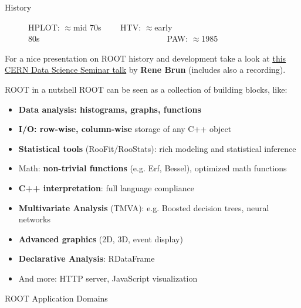\documentclass[aspectratio=169]{beamer}
\newcommand{\myfigure}[2]{
    \begin{figure}
        \makebox[\textwidth]{%
            \texttt{[image: \#2]}
        }
    \end{figure}
}
\newcommand{\myhref}[2]{{\color{blue}\href{#1}{\underline{#2}}}}
\begin{document}
\begin{frame}{History}
\begin{figure}
    HPLOT: $\approx$mid 70s ~~~~HTV: $\approx$early 80s~~~~~~~~~~~~~~~~~~~~~~~~~~~~~~~PAW: $\approx$1985
    \end{figure}
    \vspace{5mm}
    For a nice presentation on ROOT history and development take a look at \myhref{https://indico.cern.ch/event/667648/}{this CERN Data Science Seminar talk} by \textbf{Rene Brun} (includes also a recording).
\end{frame}

\begin{frame}{ROOT in a nutshell}
ROOT can be seen as a collection of building blocks, like:
\begin{itemize}
    \item \textbf{Data analysis: histograms, graphs, functions}
    \item \textbf{I/O: row-wise, column-wise} storage of any C++ object
    \item \textbf{Statistical tools} (RooFit/RooStats): rich modeling and statistical inference
    \item Math: \textbf{non-trivial functions} (e.g. Erf, Bessel), optimized math functions
    \item \textbf{C++ interpretation}: full language compliance
    \item \textbf{Multivariate Analysis} (TMVA): e.g. Boosted decision trees, neural networks
    \item \textbf{Advanced graphics} (2D, 3D, event display)
    \item \textbf{Declarative Analysis}: RDataFrame
    \item And more: HTTP server, JavaScript visualization
\end{itemize}
\end{frame}


\begin{frame}{ROOT Application Domains}
    \myfigure{1.0}{root_domains.png}
\end{frame}
\end{document}
